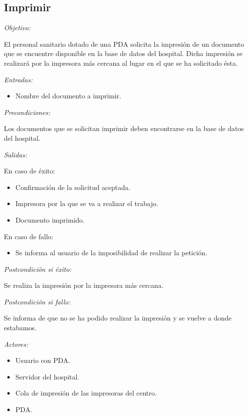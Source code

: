 \documentclass[12pt,a4paper,notitlepage,twoside]{report}
\begin{document}
\subsection{Imprimir}
\emph{Objetivo:}
\begin{description}
El personal sanitario dotado de una PDA solicita la impresi\'on de un documento que se encuentre disponible en la base de datos del hospital. Dicha impresi\'on se realizará por la impresora m\'as cercana al lugar en el que se ha solicitado \'esta.
\end{description}
\emph{Entradas:} 
\begin{itemize}
\item Nombre del documento a imprimir.
\end{itemize}
\emph{Precondiciones:}
\begin{description}
Los documentos que se solicitan imprimir deben encontrarse en la base de datos del hospital.
\end{description}
\emph{Salidas:}
\begin{description}
\item En caso de \'exito: 
\begin{itemize}
\item Confirmaci\'on de la solicitud aceptada.
\item Impresora por la que se va a realizar el trabajo.
\item Documento imprimido.
\end{itemize}
\item En caso de fallo: 
\begin{itemize}
\item Se informa al usuario de la imposibilidad de realizar la petici\'on.
\end{itemize}
\end{description}
\emph{Postcondici\'on si \'exito:}
\begin{description}
Se realiza la impresi\'on por la impresora m\'as cercana.
\end{description}
\emph{Postcondici\'on si fallo:}
\begin{description}
Se informa de que no se ha podido realizar la impresi\'on y se vuelve a donde estabamos.
\end{description}
\emph{Actores: }
\begin{itemize}
\item Usuario con PDA.
\item Servidor del hospital.
\item Cola de impresi\'on de las impresoras del centro.
\item PDA.
\end{itemize}
\end{document}

